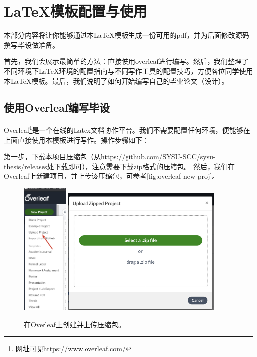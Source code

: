 \chapter{\LaTeX 模板配置与使用}


\label{cha:sysu-thesis-latex-install-guide}

本部分内容将让你能够通过本\LaTeX 模板生成一份可用的pdf，并为后面修改源码撰写毕设做准备。

首先，我们会展示最简单的方法：直接使用overleaf进行编写。然后，我们整理了不同环境下\LaTeX 环境的配置指南与不同写作工具的配置技巧，方便各位同学使用本\LaTeX 模板。最后，我们说明了如何开始编写自己的毕业论文（设计）。


\section{使用Overleaf编写毕设}

Overleaf\footnote{网址可见\url{https://www.overleaf.com/}}是一个在线的Latex文档协作平台。我们不需要配置任何环境，便能够在上面直接使用本模板进行写作。操作步骤如下：

第一步，下载本项目压缩包（从\url{https://github.com/SYSU-SCC/sysu-thesis/releases}处下载即可），注意需要下载zip格式的压缩包。
然后，我们在Overleaf上新建项目，并上传该压缩包，可参考\autoref{fig:overleaf-new-proj}。


\begin{figure}[h]
	\centering
	\includegraphics[width=0.2\textwidth]{image/chap03/overleaf-create-proj.jpg}
	\includegraphics[width=0.7\textwidth]{image/chap03/overleaf-upload-proj.jpg}
	\caption{在Overleaf上创建并上传压缩包。}
 	\label{fig:overleaf-new-proj}
\end{figure}

